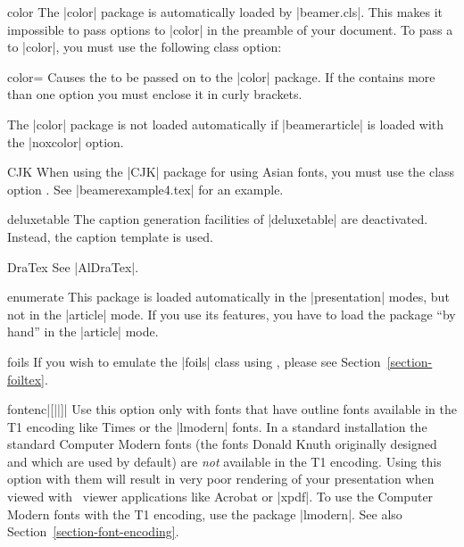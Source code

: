 \begin{package}{{color}}
  \beamernote
  The |color| package is automatically loaded by |beamer.cls|. This
  makes it impossible to pass options to |color| in the preamble of
  your document. To pass a  to |color|, you must
  use the following class option:

  \begin{classoption}{color={\normalfont{}}}
    Causes the  to be passed on to the |color|
    package. If the  contains more than one
    option you must enclose it in curly brackets.
  \end{classoption}

  \articlenote
  The |color| package is not loaded automatically if
  |beamerarticle| is loaded with the |noxcolor| option.
\end{package}

\begin{package}{{CJK}}
  \beamernote
  When using the |CJK| package for using Asian fonts, you must use the
  class option . See |beamerexample4.tex| for an
  example. 
\end{package}

\begin{package}{{deluxetable}}
  \beamernote
  The caption generation facilities of |deluxetable| are
  deactivated. Instead, the caption template is used.
\end{package}

\begin{package}{{DraTex}}
  See |AlDraTex|.
\end{package}

\begin{package}{{enumerate}}
  \articlenote
  This package is loaded automatically in the |presentation| modes, but not
  in the |article| mode. If you use its features, you have to load the
  package ``by hand'' in the |article| mode.
\end{package}

\begin{class}{{foils}}
  If you wish to emulate the |foils| class using \beamer, please see
  Section~\ref{section-foiltex}.
\end{class}

\begin{package}{{fontenc}|[||]|}
  Use this option only with fonts that have outline fonts available in
  the T1 encoding like Times or the |lmodern| fonts. In a standard
  installation the standard Computer Modern fonts (the fonts Donald
  Knuth originally designed and which are used by default) are
  \emph{not} available in the T1 encoding. Using this  option with
  them will result in very poor rendering of your presentation when
  viewed with \pdf\ viewer applications like Acrobat or |xpdf|. To use
  the Computer Modern fonts with the T1 encoding, use the package
  |lmodern|.  See also Section~\ref{section-font-encoding}.
\end{package}


